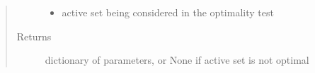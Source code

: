 \documentclass[letterpaper,10pt,english]{sphinxmanual}
\begin{document}
\begin{fulllineitems}
\begin{quote}
\begin{description}
\begin{itemize}
\item {} 
\sphinxAtStartPar
{} \textendash{} active set being considered in the optimality test

\end{itemize}

\item[{Returns}] \leavevmode
\sphinxAtStartPar
dictionary of parameters, or None if active set is not optimal

\end{description}\end{quote}

\end{fulllineitems}

\end{document}
